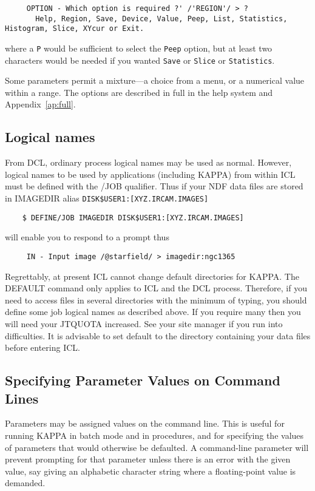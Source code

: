 \small
\begin{verbatim}
     OPTION - Which option is required ?' /'REGION'/ > ?
       Help, Region, Save, Device, Value, Peep, List, Statistics, Histogram, Slice, XYcur or Exit.
\end{verbatim}
\normalsize
where a {\tt P} would be sufficient to select the {\tt Peep} option, but at least
two characters would be needed if you wanted {\tt Save} or {\tt Slice}
or {\tt Statistics}.

Some parameters permit a mixture---a choice from a menu, or a
numerical value within a range.  The options are described in full
in the help system and Appendix~\ref{ap:full}.

\subsection{Logical names}
From {\small DCL}, ordinary process logical names may be used as normal.
However, logical names to be used by applications (including
{\small KAPPA}) from within {\small ICL} must be defined with the /JOB
qualifier. Thus if your NDF data files are stored in IMAGEDIR
alias {\tt DISK\$USER1:[XYZ.IRCAM.IMAGES]}

\small
\begin{verbatim}
    $ DEFINE/JOB IMAGEDIR DISK$USER1:[XYZ.IRCAM.IMAGES]
\end{verbatim}
\normalsize
will enable you to respond to a prompt thus

\small
\begin{verbatim}
     IN - Input image /@starfield/ > imagedir:ngc1365
\end{verbatim}
\normalsize
Regrettably, at present {\small ICL} cannot change default directories
for {\small KAPPA}.  The DEFAULT command only applies to {\small ICL}
and the {\small DCL} process.  Therefore, if you need to access files in
several directories with the minimum of typing, you should define some
job logical names as described above.  If you require many then you will
need your JTQUOTA increased.  See your site manager if you run into
difficulties.  It is advisable to set default to the directory
containing your data files before entering {\small ICL}.

\subsection{Specifying Parameter Values on Command Lines}
\label{se:cmdlindef}
Parameters may be assigned values on the command line. This is useful
for running {\small KAPPA} in batch mode and in procedures, and for
specifying the values of parameters that would otherwise be defaulted. A
command-line parameter will prevent prompting for that parameter unless
there is an error with the given value, say giving an alphabetic
character string where a floating-point value is demanded.

